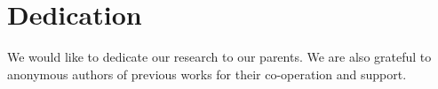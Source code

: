 \documentclass{standalone}
\begin{document}
\chapter*{Dedication}
 We would like to dedicate our research to our parents. We are also grateful to anonymous authors of previous works for their co-operation and support. 
\end{document}
